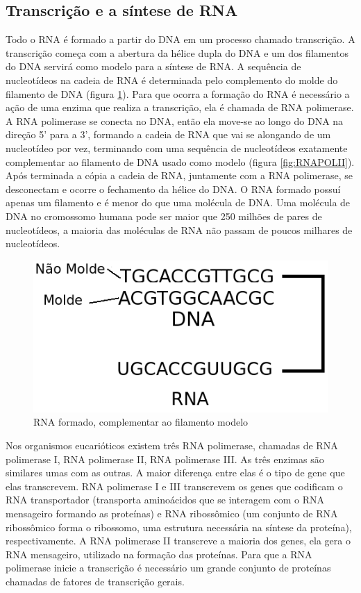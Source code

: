\subsection{ Transcrição e a síntese de RNA}


Todo o RNA é formado a partir do DNA em um processo chamado transcrição. A transcrição começa com a abertura da hélice dupla do DNA e um dos filamentos do DNA servirá como modelo para a síntese de RNA. A sequência de nucleotídeos na cadeia de RNA é determinada pelo complemento do molde do filamento de DNA (figura \ref{fig:seq_DNA_molde_e_nao_model}). Para que ocorra a formação do RNA é necessário a ação de uma enzima que realiza a transcrição, ela é chamada de RNA polimerase. A RNA polimerase se conecta no DNA, então ela move-se ao longo do DNA na direção 5' para a 3', formando a cadeia de RNA que vai se alongando de um nucleotídeo por vez, terminando com uma sequência de nucleotídeos exatamente complementar ao filamento de DNA usado como modelo (figura \ref{fig:RNAPOLII}).  Após terminada a cópia a cadeia de RNA, juntamente com a RNA polimerase, se desconectam e ocorre o fechamento da hélice do DNA. O RNA formado possuí apenas um filamento e é menor do que uma molécula de DNA. Uma molécula de DNA no cromossomo humana pode ser maior que 250 milhões de pares de nucleotídeos, a maioria das moléculas de RNA não passam de poucos milhares de nucleotídeos.

\begin{figure}[htb!]
    \centering
    \includegraphics[scale=0.7]{./imagens/seq_DNA_molde_e_nao_model.png}
    \caption{RNA formado, complementar ao filamento modelo}
    \label{fig:seq_DNA_molde_e_nao_model}
\end{figure}


Nos organismos eucarióticos existem três RNA polimerase, chamadas de RNA polimerase I, RNA polimerase II, RNA polimerase III. As três enzimas são similares umas com as outras. A maior diferença entre elas é o tipo de gene que elas transcrevem. RNA polimerase I e III transcrevem os genes que codificam o RNA transportador (transporta aminoácidos que se interagem com o RNA mensageiro formando as proteínas)  e RNA ribossômico (um conjunto de RNA ribossômico forma o ribossomo, uma estrutura necessária na síntese da proteína), respectivamente. A RNA polimerase II transcreve a maioria dos genes, ela gera o RNA mensageiro, utilizado na formação das proteínas. Para que a RNA polimerase inicie a transcrição é necessário um grande conjunto de proteínas chamadas de fatores de transcrição gerais.

